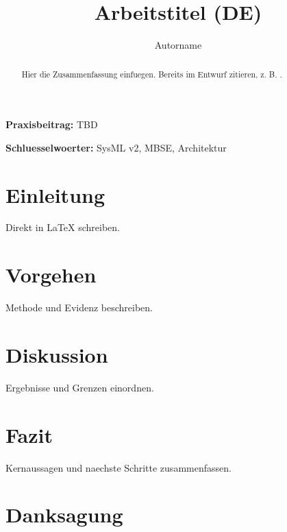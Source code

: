 \documentclass[11pt,a4paper]{article}
\title{Arbeitstitel (DE)}
\author{Autorname}
\date{}
\begin{document}
\maketitle

\textbf{Praxisbeitrag:} TBD

\begin{abstract}
Hier die Zusammenfassung einfuegen. Bereits im Entwurf zitieren, z. B. \cite{Weilkiens2024_SysMLv2Book}.
\end{abstract}

\textbf{Schluesselwoerter:} SysML v2, MBSE, Architektur

\section{Einleitung}
Direkt in LaTeX schreiben.

\section{Vorgehen}
Methode und Evidenz beschreiben.

\section{Diskussion}
Ergebnisse und Grenzen einordnen.

\section{Fazit}
Kernaussagen und naechste Schritte zusammenfassen.

\section*{Danksagung}



\end{document}
